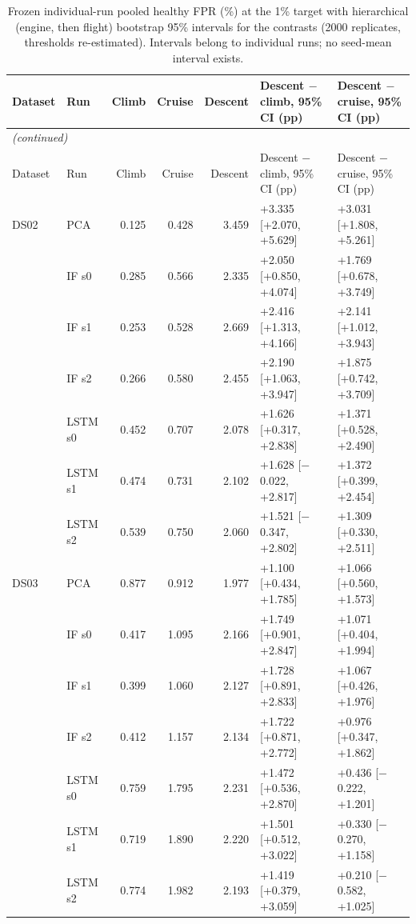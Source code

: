 \begin{footnotesize}
\begin{longtable}{llrrrll}
\caption{Frozen individual-run pooled healthy FPR (\%) at the 1\% target with hierarchical (engine, then flight) bootstrap 95\% intervals for the contrasts (2000 replicates, thresholds re-estimated). Intervals belong to individual runs; no seed-mean interval exists.}\label{tab:s4_runs_intervals}\\
\toprule
Dataset & Run & Climb & Cruise & Descent & Descent $-$ climb, 95\% CI (pp) & Descent $-$ cruise, 95\% CI (pp) \\
\midrule
\endfirsthead
\multicolumn{7}{l}{\emph{(continued)}}\\
\toprule
Dataset & Run & Climb & Cruise & Descent & Descent $-$ climb, 95\% CI (pp) & Descent $-$ cruise, 95\% CI (pp) \\
\midrule
\endhead
\bottomrule
\endfoot
DS02 & PCA & 0.125 & 0.428 & 3.459 & +3.335 [+2.070, +5.629] & +3.031 [+1.808, +5.261] \\
 & IF s0 & 0.285 & 0.566 & 2.335 & +2.050 [+0.850, +4.074] & +1.769 [+0.678, +3.749] \\
 & IF s1 & 0.253 & 0.528 & 2.669 & +2.416 [+1.313, +4.166] & +2.141 [+1.012, +3.943] \\
 & IF s2 & 0.266 & 0.580 & 2.455 & +2.190 [+1.063, +3.947] & +1.875 [+0.742, +3.709] \\
 & LSTM s0 & 0.452 & 0.707 & 2.078 & +1.626 [+0.317, +2.838] & +1.371 [+0.528, +2.490] \\
 & LSTM s1 & 0.474 & 0.731 & 2.102 & +1.628 [$-$0.022, +2.817] & +1.372 [+0.399, +2.454] \\
 & LSTM s2 & 0.539 & 0.750 & 2.060 & +1.521 [$-$0.347, +2.802] & +1.309 [+0.330, +2.511] \\
\midrule
DS03 & PCA & 0.877 & 0.912 & 1.977 & +1.100 [+0.434, +1.785] & +1.066 [+0.560, +1.573] \\
 & IF s0 & 0.417 & 1.095 & 2.166 & +1.749 [+0.901, +2.847] & +1.071 [+0.404, +1.994] \\
 & IF s1 & 0.399 & 1.060 & 2.127 & +1.728 [+0.891, +2.833] & +1.067 [+0.426, +1.976] \\
 & IF s2 & 0.412 & 1.157 & 2.134 & +1.722 [+0.871, +2.772] & +0.976 [+0.347, +1.862] \\
 & LSTM s0 & 0.759 & 1.795 & 2.231 & +1.472 [+0.536, +2.870] & +0.436 [$-$0.222, +1.201] \\
 & LSTM s1 & 0.719 & 1.890 & 2.220 & +1.501 [+0.512, +3.022] & +0.330 [$-$0.270, +1.158] \\
 & LSTM s2 & 0.774 & 1.982 & 2.193 & +1.419 [+0.379, +3.059] & +0.210 [$-$0.582, +1.025] \\
\end{longtable}
\end{footnotesize}

